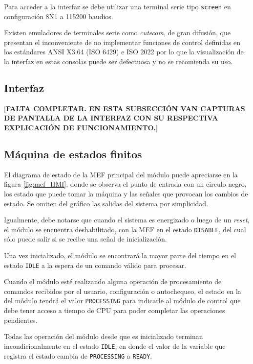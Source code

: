 Para acceder a la interfaz se debe utilizar una terminal serie tipo \texttt{screen} \citep{screen} en configuración 8N1 a 115200 baudios. 

Existen emuladores de terminales serie como \textit{cutecom}, de gran difusión, que presentan el inconveniente de no implementar funciones de control definidas en los estándares ANSI X3.64 (ISO 6429) e ISO 2022 por lo que la visualización de la interfaz en estas consolas puede ser defectuosa y no se recomienda su uso.


\subsection{Interfaz}

[\textbf{FALTA COMPLETAR.  EN ESTA SUBSECCIÓN VAN CAPTURAS DE PANTALLA DE LA INTERFAZ CON SU RESPECTIVA EXPLICACIÓN DE FUNCIONAMIENTO.}]

\subsection{Máquina de estados finitos}

El diagrama de estado de la MEF principal del módulo puede apreciarse en la figura \ref{fig:mef_HMI}, donde se observa el punto de entrada con un circulo negro, los estado que puede tomar la máquina y las señales que provocan los cambios de estado. Se omiten del gráfico las salidas del sistema por simplicidad. 

Igualmente, debe notarse que cuando el sistema es energizado o luego de un \textit{reset}, el módulo se encuentra deshabilitado, con la MEF en el estado \texttt{DISABLE}, del cual sólo puede salir si se recibe una señal de inicialización.  

Una vez inicializado, el módulo se encontrará la mayor parte del tiempo en el estado \texttt{IDLE} a la espera de un comando válido para procesar.  

Cuando el módulo esté realizando alguna operación de procesamiento de comandos recibidos por el usuario, configuración o autochequeo, el estado en la del módulo tendrá el valor \texttt{PROCESSING} para indicarle al módulo de control que debe tener acceso a tiempo de CPU para poder completar las operaciones pendientes.  

Todas las operación del módulo desde que es inicializado terminan incondicionalmente en el estado \texttt{IDLE}, en donde el valor de la variable que registra el estado cambia de \texttt{PROCESSING} a \texttt{READY}.

